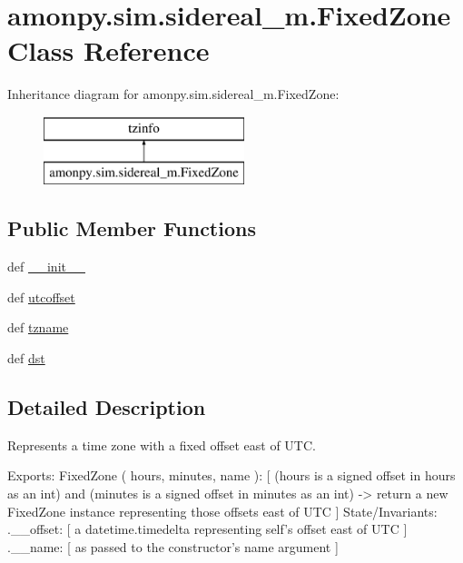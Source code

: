 \hypertarget{classamonpy_1_1sim_1_1sidereal__m_1_1_fixed_zone}{\section{amonpy.\-sim.\-sidereal\-\_\-m.\-Fixed\-Zone Class Reference}
\label{classamonpy_1_1sim_1_1sidereal__m_1_1_fixed_zone}
}
Inheritance diagram for amonpy.\-sim.\-sidereal\-\_\-m.\-Fixed\-Zone\-:\begin{figure}[H]
\begin{center}
\leavevmode
\includegraphics[height=2.000000cm]{classamonpy_1_1sim_1_1sidereal__m_1_1_fixed_zone}
\end{center}
\end{figure}
\subsection*{Public Member Functions}
\begin{DoxyCompactItemize}
\item 
def \hyperlink{classamonpy_1_1sim_1_1sidereal__m_1_1_fixed_zone_a0e29cd625591a8a1bad0c567ad775898}{\-\_\-\-\_\-init\-\_\-\-\_\-}
\item 
def \hyperlink{classamonpy_1_1sim_1_1sidereal__m_1_1_fixed_zone_a747541b59e840bcfdf7df8805f9b1179}{utcoffset}
\item 
def \hyperlink{classamonpy_1_1sim_1_1sidereal__m_1_1_fixed_zone_ae3a652035c1a0d2ed33028e1e647c72b}{tzname}
\item 
def \hyperlink{classamonpy_1_1sim_1_1sidereal__m_1_1_fixed_zone_a7f7ae1103d0ccbbc698e595925329b8f}{dst}
\end{DoxyCompactItemize}


\subsection{Detailed Description}
\begin{DoxyVerb}Represents a time zone with a fixed offset east of UTC.

  Exports:
    FixedZone ( hours, minutes, name ):
      [ (hours is a signed offset in hours as an int) and
        (minutes is a signed offset in minutes as an int) ->
          return a new FixedZone instance representing
          those offsets east of UTC ]
  State/Invariants:
    .__offset:
      [ a datetime.timedelta representing self's offset
        east of UTC ]
    .__name:
      [ as passed to the constructor's name argument ]
\end{DoxyVerb}
 

